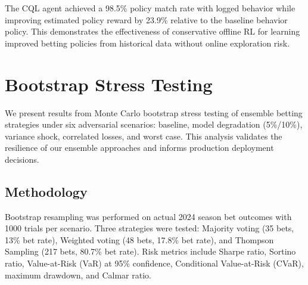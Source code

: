 \begin{figure}[htbp]
\centering
{}
\end{figure}

The CQL agent achieved a 98.5\% policy match rate with logged behavior while improving estimated policy reward by 23.9\% relative to the baseline behavior policy. This demonstrates the effectiveness of conservative offline RL for learning improved betting policies from historical data without online exploration risk.

\section{Bootstrap Stress Testing}\label{app:bootstrap}
We present results from Monte Carlo bootstrap stress testing of ensemble betting strategies under six adversarial scenarios: baseline, model degradation (5\%/10\%), variance shock, correlated losses, and worst case. This analysis validates the resilience of our ensemble approaches and informs production deployment decisions.

\subsection{Methodology}
Bootstrap resampling was performed on actual 2024 season bet outcomes with 1000 trials per scenario. Three strategies were tested: Majority voting (35 bets, 13\% bet rate), Weighted voting (48 bets, 17.8\% bet rate), and Thompson Sampling (217 bets, 80.7\% bet rate). Risk metrics include Sharpe ratio, Sortino ratio, Value-at-Risk (VaR) at 95\% confidence, Conditional Value-at-Risk (CVaR), maximum drawdown, and Calmar ratio.

